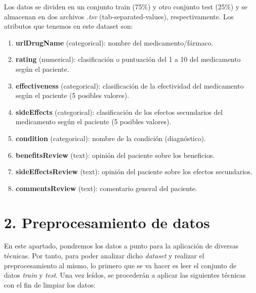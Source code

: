 \documentclass[spanish,]{article}
\providecommand{\tightlist}{%
  \setlength{\itemsep}{0pt}\setlength{\parskip}{0pt}}
\begin{document}
Los datos se dividen en un conjunto train (75\%) y otro conjunto test
(25\%) y se almacenan en dos archivos \emph{.tsv}
(tab-separated-values), respectivamente. Los atributos que tenemos en
este dataset son:

\begin{enumerate}
\def\labelenumi{\arabic{enumi}.}
\tightlist
\item
  \textbf{urlDrugName} (categorical): nombre del medicamento/fármaco.
\item
  \textbf{rating} (numerical): clasificación o puntuación del 1 a 10 del
  medicamento según el paciente.
\item
  \textbf{effectiveness} (categorical): clasificación de la efectividad
  del medicamento según el paciente (5 posibles valores).
\item
  \textbf{sideEffects} (categorical): clasificación de los efectos
  secundarios del medicamento según el paciente (5 posibles valores).
\item
  \textbf{condition} (categorical): nombre de la condición
  (diagnóstico).
\item
  \textbf{benefitsReview} (text): opinión del paciente sobre los
  beneficios.
\item
  \textbf{sideEffectsReview} (text): opinión del paciente sobre los
  efectos secundarios.
\item
  \textbf{commentsReview} (text): comentario general del paciente.
\end{enumerate}

\section{2. Preprocesamiento de datos}\label{preprocesamiento-de-datos}

En este apartado, pondremos los datos a punto para la aplicación de
diversas técnicas. Por tanto, para poder analizar dicho \emph{dataset} y
realizar el preprocesamiento al mismo, lo primero que se va hacer es
leer el conjunto de datos \emph{train} y \emph{test}. Una vez leídos, se
procederán a aplicar las siguientes técnicas con el fin de limpiar los
datos:
\end{document}
